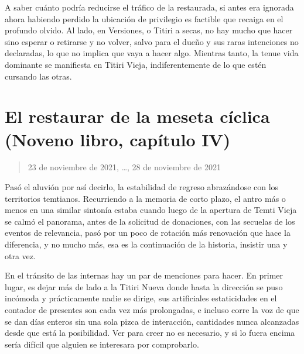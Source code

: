 \documentclass[
]{book}
\begin{document}
A saber cuánto podría reducirse el tráfico de la restaurada, si antes era ignorada ahora habiendo perdido la ubicación de privilegio es factible que recaiga en el profundo olvido. Al lado, en Versiones, o Titiri a secas, no hay mucho que hacer sino esperar o retirarse y no volver, salvo para el dueño y sus raras intenciones no declaradas, lo que no implica que vaya a hacer algo. Mientras tanto, la tenue vida dominante se manifiesta en Titiri Vieja, indiferentemente de lo que estén cursando las otras.

\hypertarget{el-restaurar-de-la-meseta-cuxedclica-noveno-libro-capuxedtulo-iv}{%
\section{El restaurar de la meseta cíclica (Noveno libro, capítulo IV)}\label{el-restaurar-de-la-meseta-cuxedclica-noveno-libro-capuxedtulo-iv}}

\begin{quote}
23 de noviembre de 2021, \ldots, 28 de noviembre de 2021
\end{quote}

Pasó el aluvión por así decirlo, la estabilidad de regreso abrazándose con los territorios temtianos. Recurriendo a la memoria de corto plazo, el antro más o menos en una similar sintonía estaba cuando luego de la apertura de Temti Vieja se calmó el panorama, antes de la solicitud de donaciones, con las secuelas de los eventos de relevancia, pasó por un poco de rotación más renovación que hace la diferencia, y no mucho más, esa es la continuación de la historia, insistir una y otra vez.

En el tránsito de las internas hay un par de menciones para hacer. En primer lugar, es dejar más de lado a la Titiri Nueva donde hasta la dirección se puso incómoda y prácticamente nadie se dirige, sus artificiales estaticidades en el contador de presentes son cada vez más prolongadas, e incluso corre la voz de que se dan días enteros sin una sola pizca de interacción, cantidades nunca alcanzadas desde que está la posibilidad. Ver para creer no es necesario, y si lo fuera encima sería difícil que alguien se interesara por comprobarlo.
\end{document}
